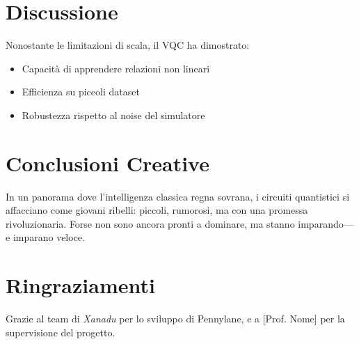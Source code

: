 \documentclass[10pt,twocolumn]{article}
\begin{document}
\begin{comment}
    \begin{figure}[h]
        \centering
        \texttt{[image: path/to/accuracy\_plot.png]}
        \caption{Evoluzione dell’accuratezza nel tempo}
        \label{fig:acc}
    \end{figure}
\end{comment}


\section{Discussione}
Nonostante le limitazioni di scala, il VQC ha dimostrato:
\begin{itemize}
    \item Capacità di apprendere relazioni non lineari
    \item Efficienza su piccoli dataset
    \item Robustezza rispetto al noise del simulatore
\end{itemize}

\section{Conclusioni Creative}
In un panorama dove l’intelligenza classica regna sovrana, i circuiti quantistici si affacciano come giovani ribelli: piccoli, rumorosi, ma con una promessa rivoluzionaria. Forse non sono ancora pronti a dominare, ma stanno imparando—e imparano veloce.

\section*{Ringraziamenti}
Grazie al team di \textit{Xanadu} per lo sviluppo di Pennylane, e a [Prof. Nome] per la supervisione del progetto.



\end{document}
